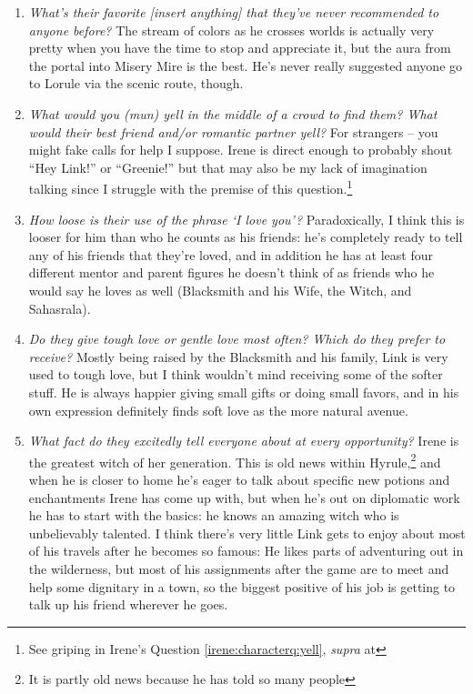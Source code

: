 \begin{enumerate}
    \item\textit{What’s their favorite [insert anything] that they’ve never recommended to anyone before?}
        The stream of colors as he crosses worlds is actually very pretty when you have the time to stop and appreciate it, but the aura from the portal into Misery Mire is the best. He's never really suggested anyone go to Lorule via the scenic route, though. 
    \item\textit{What would you (mun) yell in the middle of a crowd to find them? What would their best friend and/or romantic partner yell?}
        For strangers -- you might fake calls for help I suppose. Irene is direct enough to probably shout ``Hey Link!'' or ``Greenie!'' but that may also be my lack of imagination talking since I struggle with the premise of this question.\footnote{See griping in Irene's Question \ref{irene:characterq:yell}, \textit{supra} at \pageref{irene:characterq:yell}}
    \item\textit{How loose is their use of the phrase ‘I love you’?}
        Paradoxically, I think this is looser for him than who he counts as his friends: he's completely ready to tell any of his friends that they're loved, and in addition he has at least four different mentor and parent figures he doesn't think of as friends who he would say he loves as well (Blacksmith and his Wife, the Witch, and Sahasrala). 
    \item\textit{Do they give tough love or gentle love most often? Which do they prefer to receive?}
        Mostly being raised by the Blacksmith and his family, Link is very used to tough love, but I think wouldn't mind receiving some of the softer stuff. He is always happier giving small gifts or doing small favors, and in his own expression definitely finds soft love as the more natural avenue. 
    \item\textit{What fact do they excitedly tell everyone about at every opportunity?}
        Irene is the greatest witch of her generation. This is old news within Hyrule,\footnote{It is partly old news because he has told so many people} and when he is closer to home he's eager to talk about specific new potions and enchantments Irene has come up with, but when he's out on diplomatic work he has to start with the basics: he knows an amazing witch who is unbelievably talented. I think there's very little Link gets to enjoy about most of his travels after he becomes so famous: He likes parts of adventuring out in the wilderness, but most of his assignments after the game are to meet and help some dignitary in a town, so the biggest positive of his job is getting to talk up his friend wherever he goes.

\end{enumerate}
